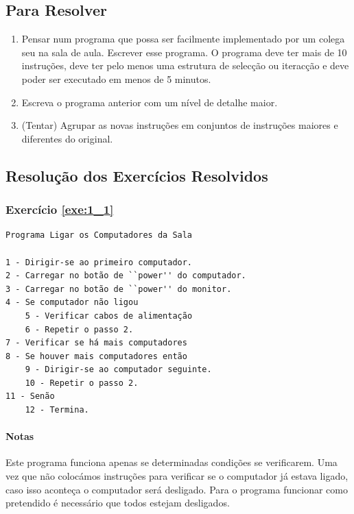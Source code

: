 \subsection{Para Resolver}
\begin{enumerate}
\item 
Pensar num programa que possa ser facilmente implementado por um colega seu na sala de aula. Escrever esse programa.  O programa deve ter mais de 10 instruções, deve ter pelo menos uma estrutura de selecção ou iteracção e deve poder ser executado em menos de 5 minutos.

\item Escreva o programa anterior com um nível de detalhe maior.

\item (Tentar) Agrupar as novas instruções em conjuntos de instruções maiores e diferentes do original.
\end{enumerate}

\subsection{Resolução dos Exercícios Resolvidos}

{\footnotesize
\subsubsection*{Exercício \ref{exe:1_1}}
\begin{verbatim}
Programa Ligar os Computadores da Sala

1 - Dirigir-se ao primeiro computador.
2 - Carregar no botão de ``power'' do computador.
3 - Carregar no botão de ``power'' do monitor.
4 - Se computador não ligou
    5 - Verificar cabos de alimentação
    6 - Repetir o passo 2.
7 - Verificar se há mais computadores     
8 - Se houver mais computadores então
    9 - Dirigir-se ao computador seguinte.
    10 - Repetir o passo 2.
11 - Senão
    12 - Termina.    
\end{verbatim}}
\paragraph{Notas}
Este programa funciona apenas se determinadas condições se verificarem. Uma vez que 
não colocámos instruções para verificar se o computador já estava ligado, caso
isso aconteça o computador será desligado. Para o programa funcionar como
pretendido é necessário que todos estejam desligados.


